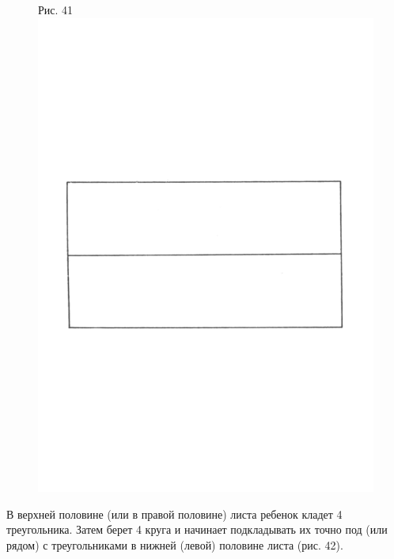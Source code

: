 \documentclass[a5paper]{book}
\begin{document}
\begin{figure}
\centering
Рис. 41 \includegraphics[width=\linewidth]{media/media/image37.png}
\end{figure}

В верхней половине (или в правой половине) листа ребенок кладет 4
треугольника. Затем берет 4 круга и начинает подкладывать их точно под
(или рядом) с треугольниками в нижней (левой) половине листа (рис. 42).
\end{document}
